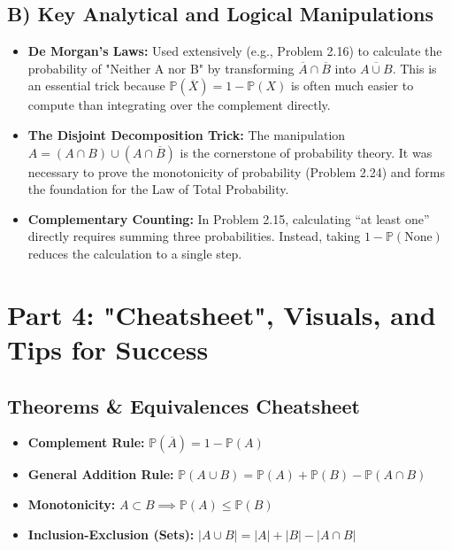 \documentclass[11pt]{article}
\begin{document}
\subsection{B) Key Analytical and Logical Manipulations}
\begin{itemize}
    \item \textbf{De Morgan's Laws:} Used extensively (e.g., Problem 2.16) to calculate the probability of "Neither A nor B" by transforming $\overline{A} \cap \overline{B}$ into $\overline{A \cup B}$. This is an essential trick because $\mathbb{P}(\overline{X}) = 1 - \mathbb{P}(X)$ is often much easier to compute than integrating over the complement directly.
    \item \textbf{The Disjoint Decomposition Trick:} The manipulation $A = (A \cap B) \cup (A \cap \overline{B})$ is the cornerstone of probability theory. It was necessary to prove the monotonicity of probability (Problem 2.24) and forms the foundation for the Law of Total Probability. 
    \item \textbf{Complementary Counting:} In Problem 2.15, calculating ``at least one'' directly requires summing three probabilities. Instead, taking $1 - \mathbb{P}(\text{None})$ reduces the calculation to a single step.
\end{itemize}

\section{Part 4: "Cheatsheet", Visuals, and Tips for Success}

\subsection{Theorems \& Equivalences Cheatsheet}
\begin{itemize}
    \item \textbf{Complement Rule:} $\mathbb{P}(\overline{A}) = 1 - \mathbb{P}(A)$
    \item \textbf{General Addition Rule:} $\mathbb{P}(A \cup B) = \mathbb{P}(A) + \mathbb{P}(B) - \mathbb{P}(A \cap B)$
    \item \textbf{Monotonicity:} $A \subset B \implies \mathbb{P}(A) \le \mathbb{P}(B)$
    \item \textbf{Inclusion-Exclusion (Sets):} $|A \cup B| = |A| + |B| - |A \cap B|$
\end{itemize}
\end{document}
